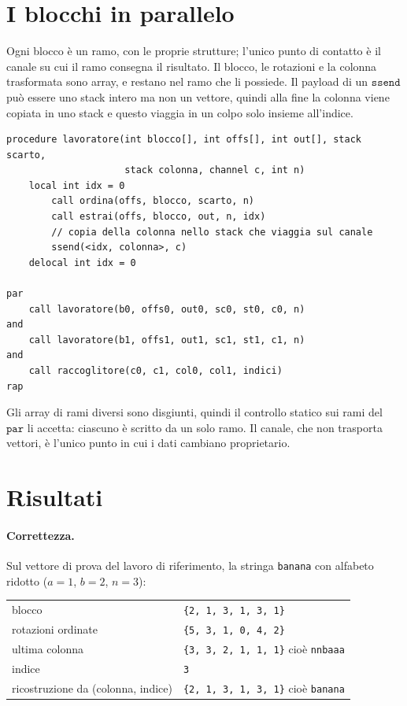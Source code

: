 \section{I blocchi in parallelo}

Ogni blocco è un ramo, con le proprie strutture; l'unico punto di contatto è il
canale su cui il ramo consegna il risultato. Il blocco, le rotazioni e la colonna
trasformata sono array, e restano nel ramo che li possiede. Il payload di un
$\mathtt{ssend}$ può essere uno stack intero ma non un vettore, quindi alla fine
la colonna viene copiata in uno stack e questo viaggia in un colpo solo insieme
all'indice.

\begin{lstlisting}
procedure lavoratore(int blocco[], int offs[], int out[], stack scarto,
                     stack colonna, channel c, int n)
    local int idx = 0
        call ordina(offs, blocco, scarto, n)
        call estrai(offs, blocco, out, n, idx)
        // copia della colonna nello stack che viaggia sul canale
        ssend(<idx, colonna>, c)
    delocal int idx = 0

par
    call lavoratore(b0, offs0, out0, sc0, st0, c0, n)
and
    call lavoratore(b1, offs1, out1, sc1, st1, c1, n)
and
    call raccoglitore(c0, c1, col0, col1, indici)
rap
\end{lstlisting}

\noindent
Gli array di rami diversi sono disgiunti, quindi il controllo statico sui rami
del $\mathtt{par}$ li accetta: ciascuno è scritto da un solo ramo. Il canale, che
non trasporta vettori, è l'unico punto in cui i dati cambiano proprietario.

\section{Risultati}

\paragraph{Correttezza.} Sul vettore di prova del lavoro di riferimento, la
stringa \texttt{banana} con alfabeto ridotto ($a=1$, $b=2$, $n=3$):

\begin{center}
\begin{tabular}{ll}
\hline
blocco & \texttt{\{2, 1, 3, 1, 3, 1\}}\\
rotazioni ordinate & \texttt{\{5, 3, 1, 0, 4, 2\}}\\
ultima colonna & \texttt{\{3, 3, 2, 1, 1, 1\}} \quad cioè \texttt{nnbaaa}\\
indice & \texttt{3}\\
ricostruzione da (colonna, indice) & \texttt{\{2, 1, 3, 1, 3, 1\}} \quad cioè \texttt{banana}\\
\hline
\end{tabular}
\end{center}

